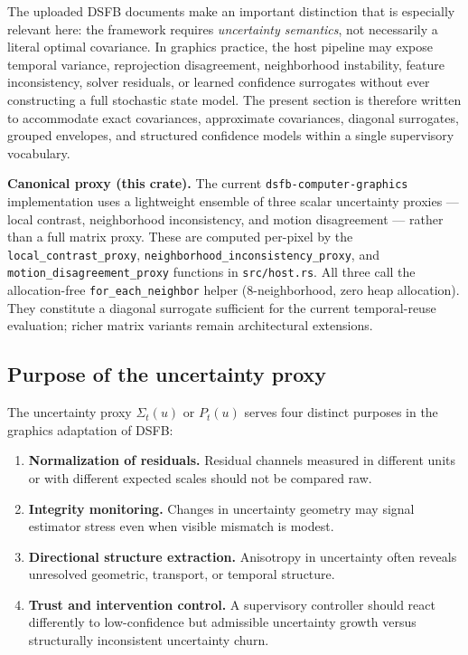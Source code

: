 \documentclass[11pt,letterpaper]{article}
\theoremstyle{gcresult}
\theoremstyle{definition}
\newenvironment{remarkbox}{%
  \begin{tcolorbox}[claimbox]%
}{%
  \end{tcolorbox}%
}
\begin{document}
The uploaded DSFB documents make an important distinction that is especially relevant here: the framework requires \emph{uncertainty semantics}, not necessarily a literal optimal covariance. In graphics practice, the host pipeline may expose temporal variance, reprojection disagreement, neighborhood instability, feature inconsistency, solver residuals, or learned confidence surrogates without ever constructing a full stochastic state model. The present section is therefore written to accommodate exact covariances, approximate covariances, diagonal surrogates, grouped envelopes, and structured confidence models within a single supervisory vocabulary.

\begin{remarkbox}
\textbf{Canonical proxy (this crate).}
The current \texttt{dsfb-computer-graphics} implementation uses a lightweight ensemble of three scalar uncertainty proxies — local contrast, neighborhood inconsistency, and motion disagreement — rather than a full matrix proxy. These are computed per-pixel by the \texttt{local\_contrast\_proxy}, \texttt{neighborhood\_inconsistency\_proxy}, and \texttt{motion\_disagreement\_proxy} functions in \texttt{src/host.rs}. All three call the allocation-free \texttt{for\_each\_neighbor} helper (8-neighborhood, zero heap allocation). They constitute a diagonal surrogate sufficient for the current temporal-reuse evaluation; richer matrix variants remain architectural extensions.
\end{remarkbox}


\subsection{Purpose of the uncertainty proxy}

The uncertainty proxy $\Sigma_t(u)$ or $P_t(u)$ serves four distinct purposes in the graphics adaptation of DSFB:

\begin{enumerate}[leftmargin=1.5em]
    \item \textbf{Normalization of residuals.} Residual channels measured in different units or with different expected scales should not be compared raw.
    \item \textbf{Integrity monitoring.} Changes in uncertainty geometry may signal estimator stress even when visible mismatch is modest.
    \item \textbf{Directional structure extraction.} Anisotropy in uncertainty often reveals unresolved geometric, transport, or temporal structure.
    \item \textbf{Trust and intervention control.} A supervisory controller should react differently to low-confidence but admissible uncertainty growth versus structurally inconsistent uncertainty churn.
\end{enumerate}
\end{document}
